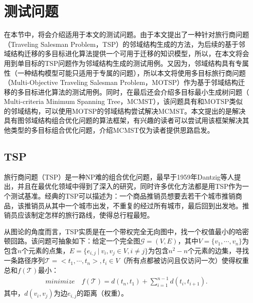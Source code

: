 \section{测试问题}
\label{sec:背景介绍:测试问题}
在本节中，将会介绍适用于本文的测试问题。由于本文提出了一种针对旅行商问题（Traveling Salesman Problem，TSP）的邻域结构生成的方法，为后续的基于邻域结构迁移的多目标进化算法提供一个可用于迁移的知识模型，所以，在本文将会用到单目标的TSP问题作为邻域结构生成的测试用例。又因为，邻域结构具有专属性（一种结构模型可能只适用于专属的问题），所以本文将使用多目标旅行商问题（Multi-Objective Traveling Salesman Problem，MOTSP）作为基于邻域结构迁移的多目标进化算法的测试用例。同时，在最后还会介绍多目标最小生成树问题（ Multi-criteria Minimum Spanning Tree，MCMST），该问题具有和MOTSP类似的邻域结构，可以使用MOTSP的邻域结构尝试解决MCMST。本文提出的是解决具有图邻域结构组合优化问题的算法框架，有兴趣的读者可以尝试用该框架解决其他类型的多目标组合优化问题，介绍MCMST仅为读者提供思路启发。

\subsection{TSP}
\label{subsec:背景介绍:测试问题:TSP}
旅行商问题（TSP）是一种NP难的组合优化问题\cite{johnson1990traveling,baraglia2001hybrid,johnson2007experimental}，最早于1959年Dantzig等人提出，并且在最优化领域中得到了深入的研究，同时许多优化方法都是用TSP作为一个测试基准。经典的TSP可以描述为：一个商品推销员想要去若干个城市推销商品，该推销员从其中一个城市出发，不重复的经过所有城市，最后回到出发地。推销员应该制定怎样的旅行路线，使得总行程最短。
\par
从图论的角度而言，TSP实质是在一个带权完全无向图中，找一个权值最小的哈密顿回路。该问题可抽象如下：给定一个完全图$\mathcal{G}=(V,E)$，其中$V = \{ v_1, \cdots, v_n \}$为包含$n$个元素的点集，$E = \{ e_{i,j} \ | \ v_i,v_j \in V, i \not = j \}$为包含$n^2-n$个元素的边集，寻找一条路径序列$\mathcal{T} = <t_1, \cdots, t_n>, t_i \in V $（所有点都被访问且仅访问一次）使得权重总和$f(\mathcal{T})$最小：
\begin{align}
    \label{eq:TSP}
    minimize \quad f(\mathcal{T}) = d(t_n,t_1) + \sum_{i=1}^{n-1} d(t_i,t_{i+1}).
\end{align}
其中，$d(v_i, v_j)$为边$e_{i,j}$的距离（权重）。

